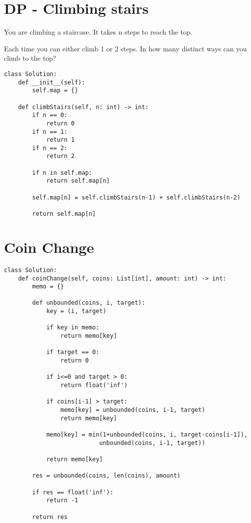 \documentclass[24pt, a4]{article}
\begin{document}
\section{DP - Climbing stairs}
You are climbing a staircase. It takes n steps to reach the top.

Each time you can either climb 1 or 2 steps. In how many distinct ways can you climb to the top?
\begin{lstlisting}
class Solution:
    def __init__(self):
        self.map = {}
        
    def climbStairs(self, n: int) -> int:
        if n == 0:
            return 0
        if n == 1:
            return 1
        if n == 2:
            return 2
        
        if n in self.map:
            return self.map[n]
        
        self.map[n] = self.climbStairs(n-1) + self.climbStairs(n-2)
        
        return self.map[n]
\end{lstlisting}

\section{Coin Change}
\begin{lstlisting}
class Solution:
    def coinChange(self, coins: List[int], amount: int) -> int:
        memo = {}
        
        def unbounded(coins, i, target):
            key = (i, target)
            
            if key in memo:
                return memo[key]
            
            if target == 0:
                return 0
            
            if i<=0 and target > 0:
                return float('inf')
            
            if coins[i-1] > target:
                memo[key] = unbounded(coins, i-1, target)
                return memo[key]
            
            memo[key] = min(1+unbounded(coins, i, target-coins[i-1]),
                           unbounded(coins, i-1, target))
            
            return memo[key]
        
        res = unbounded(coins, len(coins), amount)
        
        if res == float('inf'):
            return -1
        
        return res
\end{lstlisting}
\end{document}
